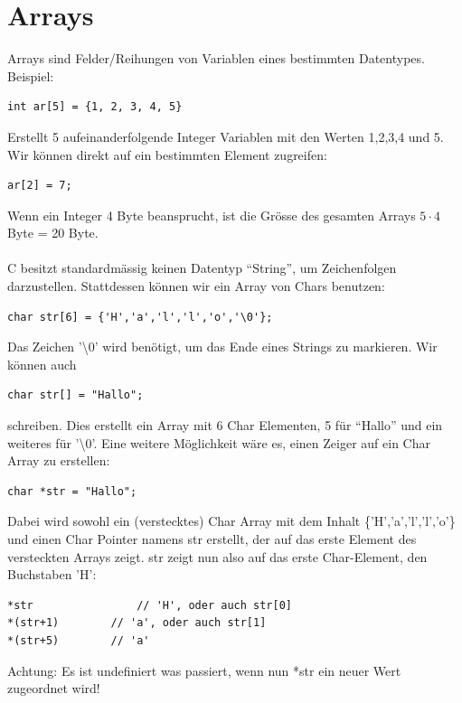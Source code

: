 \documentclass[a4paper,10pt]{report}
\begin{document}
\section{Arrays}
Arrays sind Felder/Reihungen von Variablen eines bestimmten Datentypes. Beispiel:\\
\begin{lstlisting}[]
int ar[5] = {1, 2, 3, 4, 5}
\end{lstlisting}
Erstellt 5 aufeinanderfolgende Integer Variablen mit den Werten 1,2,3,4 und 5. Wir können direkt auf ein bestimmten Element zugreifen:\\
\begin{lstlisting}[]
ar[2] = 7;
\end{lstlisting}
Wenn ein Integer 4 Byte beansprucht, ist die Grösse des gesamten Arrays $5 \cdot 4$ Byte = 20 Byte. \\\\
C besitzt standardmässig keinen Datentyp "`String"', um Zeichenfolgen darzustellen. Stattdessen können wir ein Array von Chars benutzen:\\
\begin{lstlisting}[]
char str[6] = {'H','a','l','l','o','\0'};
\end{lstlisting}
Das Zeichen '\textbackslash 0' wird benötigt, um das Ende eines Strings zu markieren. Wir können auch \\
\begin{lstlisting}[]
char str[] = "Hallo";
\end{lstlisting}
schreiben. Dies erstellt ein Array mit 6 Char Elementen, 5 für "`Hallo"' und ein weiteres für '\textbackslash 0'.
Eine weitere Möglichkeit wäre es, einen Zeiger auf ein Char Array zu erstellen:\\
\begin{lstlisting}[]
char *str = "Hallo";
\end{lstlisting}
Dabei wird sowohl ein (verstecktes) Char Array mit dem Inhalt \{'H','a','l','l','o'\} und einen Char Pointer namens str erstellt, der auf das erste Element des versteckten Arrays zeigt. str zeigt nun also auf das erste Char-Element, den Buchstaben 'H':\\
\begin{lstlisting}[]
*str 				// 'H', oder auch str[0]
*(str+1) 		// 'a', oder auch str[1]
*(str+5) 		// 'a'
\end{lstlisting}
Achtung: Es ist undefiniert was passiert, wenn nun *str ein neuer Wert zugeordnet wird!
\end{document}
